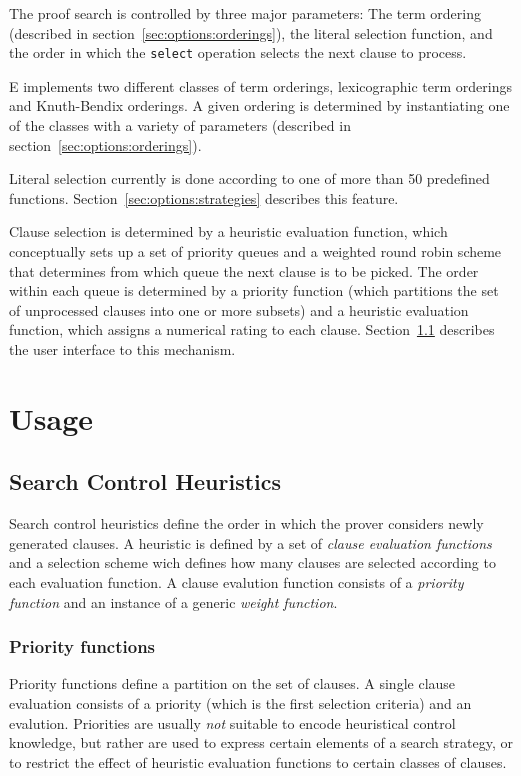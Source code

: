 \documentclass{article}
\begin{document}
The proof search is controlled by three major parameters: The term
ordering (described in section~\ref{sec:options:orderings}), the
literal selection function, and the order in which the \texttt{select}
operation selects the next clause to process. 

E implements two different classes of term orderings, lexicographic
term orderings and Knuth-Bendix orderings. A given ordering is
determined by instantiating one of the classes with a variety of
parameters (described in section~\ref{sec:options:orderings}).

Literal selection currently is done according to one of more than 50
predefined functions. Section~\ref{sec:options:strategies} describes
this feature.

Clause selection is determined by a heuristic evaluation function,
which conceptually sets up a set of priority queues and a weighted
round robin scheme that determines from which queue the next clause is
to be picked. The order within each queue is determined by a priority
function (which partitions the set of unprocessed clauses into one or
more subsets) and a heuristic evaluation function, which assigns a
numerical rating to each clause.  Section~\ref{sec:options:heuristics}
describes the user interface to this mechanism.



\section{Usage}
\label{sec:options}


\subsection{Search Control Heuristics}
\label{sec:options:heuristics}

Search control heuristics define the order in which the prover
considers newly generated clauses. A heuristic is defined by a set of
\emph{clause evaluation functions} and a selection scheme wich defines
how many clauses are selected according to each evaluation function. A
clause evalution function consists of a \emph{priority function} and
an instance of a generic \emph{weight function}.

\subsubsection{Priority functions}

Priority functions define a partition on the set of clauses.  A single
clause evaluation consists of a priority (which is the first selection
criteria) and an evalution. Priorities are usually \emph{not} suitable
to encode heuristical control knowledge, but rather are used to
express certain elements of a search strategy, or to restrict the
effect of heuristic evaluation functions to certain classes of
clauses.
\end{document}
